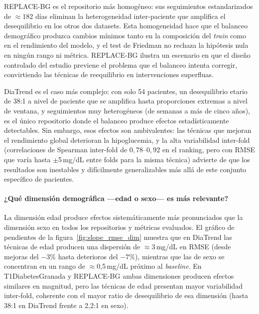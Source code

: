 REPLACE-BG es el repositorio más homogéneo: sus seguimientos estandarizados
de $\approx$182 días eliminan la heterogeneidad inter-paciente que amplifica
el desequilibrio en los otros dos datasets. Esta homogeneidad hace que el
balanceo demográfico produzca cambios mínimos tanto en la composición del
\textit{train} como en el rendimiento del modelo, y el test de Friedman no
rechaza la hipótesis nula en ningún rango ni métrica. REPLACE-BG ilustra
un escenario en que el diseño controlado del estudio previene el problema
que el balanceo intenta corregir, convirtiendo las técnicas de reequilibrio
en intervenciones superfluas.


DiaTrend es el caso más complejo: con solo 54 pacientes, un desequilibrio
etario de 38:1 a nivel de paciente que se amplifica hasta proporciones
extremas a nivel de ventana, y seguimientos muy heterogéneos (de semanas
a más de cinco años), es el único repositorio donde el balanceo produce
efectos estadísticamente detectables. Sin embargo, esos efectos son
ambivalentes: las técnicas que mejoran el rendimiento global deterioran
la hipoglucemia, y la alta variabilidad inter-fold (correlaciones de
Spearman inter-fold de $0{,}78$--$0{,}92$ en el ranking, pero con RMSE
que varía hasta $\pm$5\,mg/dL entre folds para la misma técnica)
advierte de que los resultados son inestables y difícilmente generalizables
más allá de este conjunto específico de pacientes.

\paragraph{¿Qué dimensión demográfica ---edad o sexo--- es más relevante?}

La dimensión edad produce efectos sistemáticamente más pronunciados que
la dimensión sexo en todos los repositorios y métricas evaluados. El
gráfico de pendientes de la figura~\ref{fig:slope_rmse_dim} muestra que
en DiaTrend las técnicas de edad producen una dispersión de
$\approx$3\,mg/dL en RMSE (desde mejoras del $-3\%$ hasta deterioros
del $-7\%$), mientras que las de sexo se concentran en un rango de
$\approx$0{,}5\,mg/dL próximo al \textit{baseline}. En T1DiabetesGranada
y REPLACE-BG ambas dimensiones producen efectos similares en magnitud,
pero las técnicas de edad presentan mayor variabilidad inter-fold,
coherente con el mayor ratio de desequilibrio de esa dimensión
(hasta 38:1 en DiaTrend frente a 2{,}2:1 en sexo).

